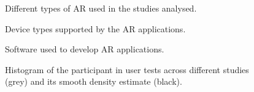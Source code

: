 \clearpage
\newpage

\begin{figure}[t!]	
	\begin{center}
	
	\caption{Different types of AR used in the studies analysed.}
	\label{fig:artech}
    \end{center}
\end{figure}

\clearpage
\newpage

\begin{figure}[t!]	
	\begin{center}
	
	\caption{Device types supported by the AR applications.}
	\label{fig:hardware}
    \end{center}
\end{figure}

\clearpage
\newpage

\begin{figure}[t!]	
	\begin{center}
	
	\caption{Software used to develop AR applications.}
	\label{fig:software}
    \end{center}
\end{figure}

\clearpage
\newpage

\begin{figure}[t!]	
	\begin{center}
	
	\caption{Histogram of the participant in user tests across different studies (grey) and its smooth density estimate (black).}
	\label{fig:testers}
    \end{center}
\end{figure}

\clearpage
\newpage